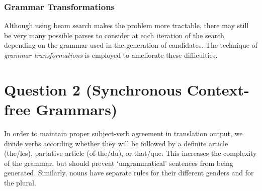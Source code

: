 \documentclass[11pt]{article}
\begin{document}

\subsubsection*{Grammar Transformations}

Although using beam search makes the problem more tractable, there may still be
very many possible parses to consider at each iteration of the search depending
on the grammar used in the generation of candidates. The technique of
\emph{grammar transformations} is employed to ameliorate these difficulties.











\section*{Question 2 (Synchronous Context-free Grammars)}

In order to maintain proper subject-verb agreement in translation output, we
divide verbs according whether they will be followed by a definite article
(the/les), partative article (of-the/du), or that/que. This increases the
complexity of the grammar, but should prevent `ungrammatical' sentences from
being generated.
Similarly, nouns have separate rules for their different genders and for the plural.
\end{document}
